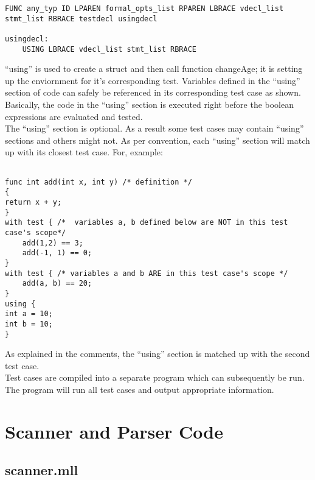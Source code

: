 \documentclass{article}
\begin{document}
\begin{Verbatim}[frame=single]
FUNC any_typ ID LPAREN formal_opts_list RPAREN LBRACE vdecl_list stmt_list RBRACE testdecl usingdecl 

usingdecl:
	USING LBRACE vdecl_list stmt_list RBRACE 
\end{Verbatim}


``using'' is used to create a struct and then call function changeAge; it is setting up the enviornment for it's corresponding test. Variables defined in the ``using'' section of code can safely be referenced in its corresponding test case as shown. Basically, the code in the ``using'' section is executed right before the boolean expressions are evaluated and tested. \\
The ``using'' section is optional. As a result some test cases may contain ``using'' sections and others might not. As per convention, each ``using'' section will match up with its closest test case. For, example:

\begin{lstlisting}

func int add(int x, int y) /* definition */
{
return x + y;
}
with test { /*  variables a, b defined below are NOT in this test case's scope*/
	add(1,2) == 3;
	add(-1, 1) == 0;
}
with test { /* variables a and b ARE in this test case's scope */
	add(a, b) == 20;
}
using {
int a = 10;
int b = 10;
}

\end{lstlisting}

As explained in the comments, the ``using'' section is matched up with the second test case.
\\
Test cases are compiled into a separate program which can subsequently be run. The program will run all test cases and output appropriate information.

\section{Scanner and Parser Code}

\subsection{scanner.mll}
\end{document}
